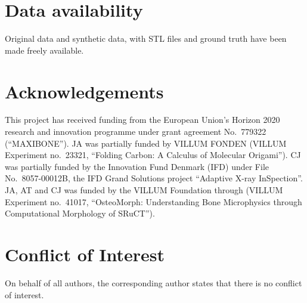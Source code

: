 \section{Data availability}

Original data and synthetic data, with STL files and ground truth have been
made freely available.

\section{Acknowledgements}

This project has received funding from the European Union’s Horizon 2020
research and innovation programme under grant agreement No.~779322
(``MAXIBONE'').  JA was partially funded by VILLUM FONDEN (VILLUM Experiment
no.~23321, “Folding Carbon: A Calculus of Molecular Origami”).  CJ was partially
funded by the Innovation Fund Denmark (IFD) under File No.~8057-00012B, the IFD
Grand Solutions project ``Adaptive X-ray InSpection''.  JA, AT and CJ was funded
by the VILLUM Foundation through (VILLUM Experiment no.~41017, “OsteoMorph:
Understanding Bone Microphysics through Computational Morphology of SRuCT”).

\section{Conflict of Interest}
On behalf of all authors, the corresponding author states that there is no
conflict of interest.

